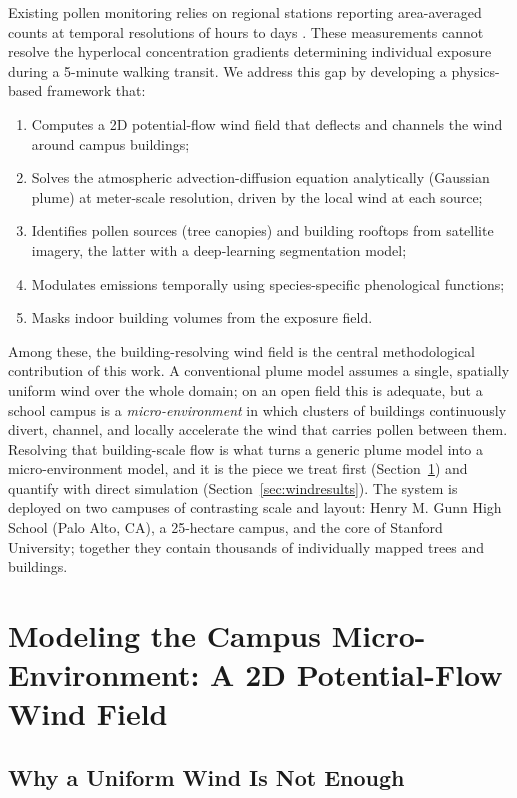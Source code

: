 \documentclass[11pt]{article}
\begin{document}
Existing pollen monitoring relies on regional stations reporting area-averaged counts at temporal resolutions of hours to days \citep{sofiev2013}. These measurements cannot resolve the hyperlocal concentration gradients determining individual exposure during a 5-minute walking transit. We address this gap by developing a physics-based framework that:
\begin{enumerate}
    \item Computes a 2D potential-flow wind field that deflects and channels the wind around campus buildings;
    \item Solves the atmospheric advection-diffusion equation analytically (Gaussian plume) at meter-scale resolution, driven by the local wind at each source;
    \item Identifies pollen sources (tree canopies) and building rooftops from satellite imagery, the latter with a deep-learning segmentation model;
    \item Modulates emissions temporally using species-specific phenological functions;
    \item Masks indoor building volumes from the exposure field.
\end{enumerate}

Among these, the building-resolving wind field is the central methodological contribution of this work. A conventional plume model assumes a single, spatially uniform wind over the whole domain; on an open field this is adequate, but a school campus is a \emph{micro-environment} in which clusters of buildings continuously divert, channel, and locally accelerate the wind that carries pollen between them. Resolving that building-scale flow is what turns a generic plume model into a micro-environment model, and it is the piece we treat first (Section~\ref{sec:windfield}) and quantify with direct simulation (Section~\ref{sec:windresults}). The system is deployed on two campuses of contrasting scale and layout: Henry M. Gunn High School (Palo Alto, CA), a 25-hectare campus, and the core of Stanford University; together they contain thousands of individually mapped trees and buildings.

\section{Modeling the Campus Micro-Environment: A 2D Potential-Flow Wind Field}
\label{sec:windfield}

\subsection{Why a Uniform Wind Is Not Enough}
\end{document}

